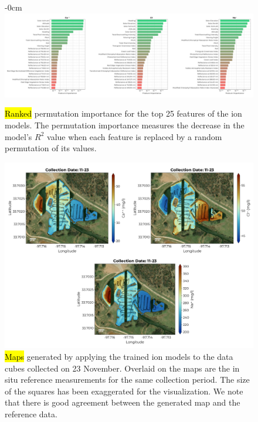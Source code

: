 \documentclass[remotesensing,article,accept,pdftex,moreauthors]{Definitions/mdpi}
\begin{document}
\vspace{-9pt}
\begin{figure}[H]
\begin{adjustwidth}{-\extralength}{0cm}
\centering
\vspace{-0.1in}
\includegraphics[width=18 cm]{figures/results/fits/ions-ranking.pdf}
\vspace{-0.1in}
\end{adjustwidth}
\caption{\hl{Ranked} %
 permutation importance for the top 25 features of the ion models. The permutation importance measures the decrease in the model's $R^2$ value when each feature is replaced by a random permutation of its values.\label{fig:ions-fi}}
\end{figure}  

\begin{figure}[H]

\vspace{-0.15in}
\hspace{-6pt}\includegraphics[width=\columnwidth]{figures/results/maps/ions.pdf}
\vspace{-0.1in}
\caption{\hl{Maps} %
 generated by applying the trained ion models to the data cubes collected on 23 November. Overlaid on the maps are the in situ reference measurements for the same collection period. The size of the squares has been exaggerated for the visualization. We note that there is good agreement between the generated map and the reference data. \label{fig:map-ions}}
\end{figure}  
\end{document}
